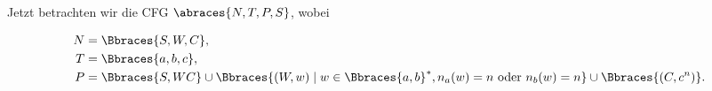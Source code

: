 \begin{solution}
Jetzt betrachten wir die CFG $\abraces{N, T, P, S}$, wobei

\begin{align*}
    N & = \Bbraces{S, W, C}, \\
    T & = \Bbraces{a, b, c}, \\
    P & = \Bbraces{S, W C} \cup \Bbraces{(W, w) \mid w \in \Bbraces{a, b}^\ast, n_a(w) = n ~\text{oder}~ n_b(w) = n} \cup \Bbraces{(C, c^n)}.
\end{align*}

\end{solution}

